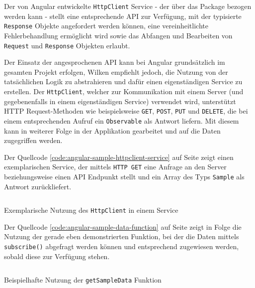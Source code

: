 \documentclass[a4paper,12pt,twoside]{scrreprt}
\begin{document}
\medskip

Der von Angular entwickelte \texttt{HttpClient} Service - der über das  Package bezogen werden kann - stellt eine entsprechende API zur Verfügung, mit der typisierte \texttt{Response} Objekte angefordert werden können, eine vereinheitlichte Fehlerbehandlung ermöglicht wird sowie das Abfangen und Bearbeiten von \texttt{Request} und \texttt{Response} Objekten erlaubt. \parencite[][]{google_llc_communicating_nodate}

\medskip

Der Einsatz der angesprochenen API kann bei Angular grundsätzlich im gesamten Projekt erfolgen, Wilken empfiehlt jedoch, die Nutzung von der tatsächlichen Logik zu abstrahieren und dafür einen eigenständigen Service zu erstellen. Der \texttt{HttpClient}, welcher zur Kommunikation mit einem Server (und gegebenenfalls in einem eigenständigen Service) verwendet wird, unterstützt HTTP Request-Methoden wie beispielsweise \texttt{GET}, \texttt{POST}, \texttt{PUT} und \texttt{DELETE}, die bei einem entsprechenden Aufruf ein \texttt{Observable} als Antwort liefern. Mit diesem kann in weiterer Folge in der Applikation gearbeitet und auf die Daten zugegriffen werden. \parencite[][Seite 142-144.]{wilken_angular_2018}

\medskip

Der Quellcode \ref{code:angular-sample-httpclient-service} auf Seite \pageref{code:angular-sample-httpclient-service} zeigt einen exemplarischen Service, der mittels \texttt{HTTP GET} eine Anfrage an den Server beziehungsweise einen API Endpunkt stellt und ein Array des Typs \texttt{Sample} als Antwort zurückliefert.

\begin{listing}[ht]
    \renewcommand{\fcolorbox}[4][]{#4}
    \inputminted[fontsize=\footnotesize,linenos]{js}{code/Luidold_HttpClient-Service.ts}
    \caption[Exemplarische Nutzung des \texttt{HttpClient} in einem Service]{Exemplarische Nutzung des \texttt{HttpClient} in einem Service}
    \label{code:angular-sample-httpclient-service}
\end{listing}

Der Quellcode \ref{code:angular-sample-data-function} auf Seite \pageref{code:angular-sample-data-function} zeigt in Folge die Nutzung der gerade eben demonstrierten Funktion, bei der die Daten mittels \texttt{subscribe()} abgefragt werden können und entsprechend zugewiesen werden, sobald diese zur Verfügung stehen.

\begin{listing}[ht]
    \renewcommand{\fcolorbox}[4][]{#4}
    \inputminted[fontsize=\footnotesize,linenos]{js}{code/Luidold_Load-function.ts}
    \caption[Beispielhafte Nutzung der \texttt{getSampleData} Funktion]{Beispielhafte Nutzung der \texttt{getSampleData} Funktion}
    \label{code:angular-sample-data-function}
\end{listing}
\end{document}
